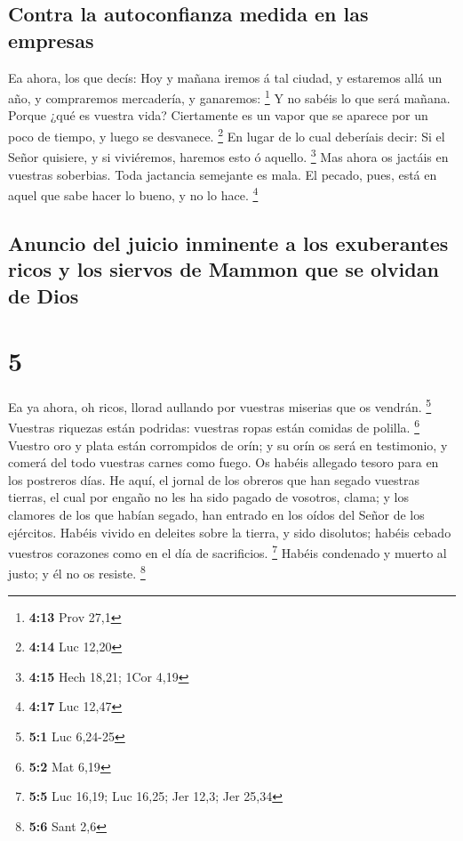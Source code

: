 \hypertarget{contra-la-autoconfianza-medida-en-las-empresas}{%
\subsection{Contra la autoconfianza medida en las
empresas}\label{contra-la-autoconfianza-medida-en-las-empresas}}

 Ea ahora, los que decís: Hoy y mañana iremos á tal ciudad,
y estaremos allá un año, y compraremos mercadería, y ganaremos:
\footnote{\textbf{4:13} Prov 27,1}  Y no sabéis lo que será
mañana. Porque ¿qué es vuestra vida? Ciertamente es un vapor que se
aparece por un poco de tiempo, y luego se desvanece. \footnote{\textbf{4:14}
  Luc 12,20}  En lugar de lo cual deberíais decir: Si el
Señor quisiere, y si viviéremos, haremos esto ó aquello. \footnote{\textbf{4:15}
  Hech 18,21; 1Cor 4,19}  Mas ahora os jactáis en vuestras
soberbias. Toda jactancia semejante es mala.  El pecado,
pues, está en aquel que sabe hacer lo bueno, y no lo hace. \footnote{\textbf{4:17}
  Luc 12,47}

\hypertarget{anuncio-del-juicio-inminente-a-los-exuberantes-ricos-y-los-siervos-de-mammon-que-se-olvidan-de-dios}{%
\subsection{Anuncio del juicio inminente a los exuberantes ricos y los
siervos de Mammon que se olvidan de
Dios}\label{anuncio-del-juicio-inminente-a-los-exuberantes-ricos-y-los-siervos-de-mammon-que-se-olvidan-de-dios}}

\hypertarget{section-4}{%
\section{5}\label{section-4}}

 Ea ya ahora, oh ricos, llorad aullando por vuestras
miserias que os vendrán. \footnote{\textbf{5:1} Luc 6,24-25}
 Vuestras riquezas están podridas: vuestras ropas están
comidas de polilla. \footnote{\textbf{5:2} Mat 6,19} 
Vuestro oro y plata están corrompidos de orín; y su orín os será en
testimonio, y comerá del todo vuestras carnes como fuego. Os habéis
allegado tesoro para en los postreros días.  He aquí, el
jornal de los obreros que han segado vuestras tierras, el cual por
engaño no les ha sido pagado de vosotros, clama; y los clamores de los
que habían segado, han entrado en los oídos del Señor de los ejércitos.
 Habéis vivido en deleites sobre la tierra, y sido
disolutos; habéis cebado vuestros corazones como en el día de
sacrificios. \footnote{\textbf{5:5} Luc 16,19; Luc 16,25; Jer 12,3; Jer
  25,34}  Habéis condenado y muerto al justo; y él no os
resiste. \footnote{\textbf{5:6} Sant 2,6}

